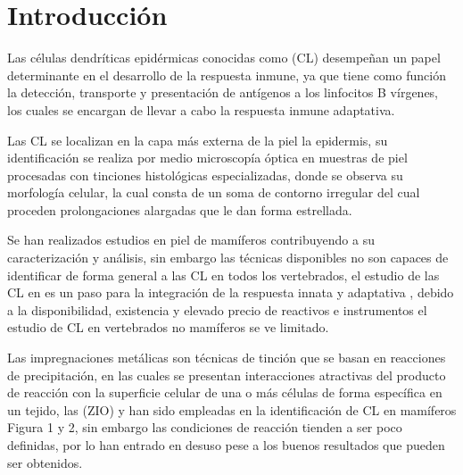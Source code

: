 \section*{Introducción}

Las células dendríticas epidérmicas conocidas como  (CL) desempeñan un papel determinante en el desarrollo de la respuesta inmune, ya que tiene como función la detección, transporte y presentación de antígenos a los linfocitos B vírgenes, los cuales se encargan de llevar a cabo la respuesta inmune adaptativa\cite{article:CL}.

Las CL se localizan en la capa más externa de la piel la epidermis, su identificación se realiza por medio microscopía óptica en muestras de piel procesadas con tinciones histológicas especializadas, donde se observa su morfología celular, la cual consta de un soma de contorno irregular del cual proceden prolongaciones alargadas que le dan forma estrellada.

Se han realizados estudios en piel de mamíferos contribuyendo a su caracterización y análisis, sin embargo las técnicas disponibles no son capaces de identificar de forma general a las CL en todos los vertebrados, el estudio de las CL en  es un paso para la integración de la respuesta innata y adaptativa \cite{article:vertebrados}, debido a la disponibilidad, existencia y elevado precio de reactivos e instrumentos el estudio de CL en vertebrados no mamíferos se ve limitado.

Las impregnaciones metálicas son técnicas de tinción que se basan en reacciones de precipitación, en las cuales se presentan interacciones atractivas del producto de reacción con la superficie celular de una o más células de forma específica en un tejido, las  (ZIO) \cite{article:ZIO} y  \cite{article:ClAu} han sido empleadas en la identificación de CL en mamíferos Figura 1 y 2, sin embargo las condiciones de reacción tienden a ser poco definidas, por lo han entrado en desuso pese a los buenos resultados que pueden ser obtenidos.

